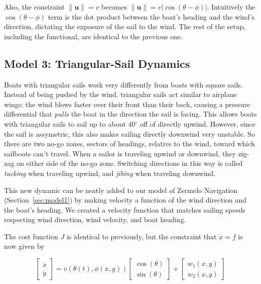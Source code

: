 \documentclass[11pt]{amsart}
\begin{document}
\par Also, the constraint $\| \mathbf{u} \| = v$ becomes $\| \mathbf{u} \| = v|\cos(\theta - \phi)|.$ Intuitively the $\cos(\theta - \phi)$ term is the dot product between the boat's heading and the wind's direction, dictating the exposure of the sail to the wind. The rest of the setup, including the functional, are identical to the previous one.

\subsection{Model 3: Triangular-Sail Dynamics}
\label{sec:model3}

\par Boats with triangular sails work very differently from boats with square sails. Instead of being pushed by the wind, triangular sails act similar to airplane wings: the wind blows faster over their front than their back, causing a pressure differential that \textit{pulls} the boat in the direction the sail is facing. This allows boats with triangular sails to sail up to about 40$^\circ$ off of directly upwind. However, since the sail is assymetric, this also makes sailing directly downwind very unstable. So there are two no-go zones, sectors of headings, relative to the wind, toward which sailboats can't travel. When a sailor is traveling upwind or downwind, they zig-zag on either side of the no-go zone. Switching directions in this way is called \textit{tacking} when traveling upwind, and \textit{jibing} when traveling downwind.

\par This new dynamic can be neatly added to our model of Zermelo Navigation (Section~\ref{sec:model1}) by making velocity a function of the wind direction and the boat's heading. We created a velocity function that matches sailing speeds respecting wind direction, wind velocity, and boat heading.


\par The cost function $J$ is identical to previously, but the constraint that $\dot{x} = f$ is now given by 

$$ \begin{bmatrix} \dot{x} \\ \dot{y} \end{bmatrix} = v(\theta(t), \phi(x, y)) \begin{bmatrix} \cos(\theta) \\ \sin(\theta) \end{bmatrix} + \begin{bmatrix} w_1(x, y) \\ w_2(x, y) \end{bmatrix}$$
\end{document}
